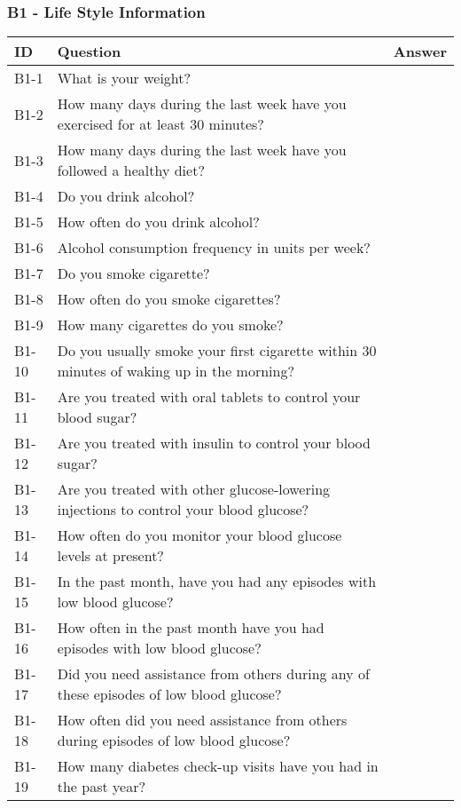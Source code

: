 \subsubsection{B1 - Life Style Information}
\begin{table}[H]
    \centering
    \renewcommand{\arraystretch}{1.2}
    \begin{tabularx}{\textwidth}{|l|X|l|}
        \hline
        \textbf{ID} & \textbf{Question} & \textbf{Answer} \\ \hline
        B1-1  & What is your weight? & \\ \hline
        B1-2  & How many days during the last week have you exercised for at least 30 minutes? & \\ \hline
        B1-3  & How many days during the last week have you followed a healthy diet? & \\ \hline
        B1-4  & Do you drink alcohol? & \\ \hline
        B1-5  & How often do you drink alcohol? & \\ \hline
        B1-6  & Alcohol consumption frequency in units per week? & \\ \hline
        B1-7  & Do you smoke cigarette? & \\ \hline
        B1-8  & How often do you smoke cigarettes? & \\ \hline
        B1-9  & How many cigarettes do you smoke? & \\ \hline
        B1-10 & Do you usually smoke your first cigarette within 30 minutes of waking up in the morning? & \\ \hline
        B1-11 & Are you treated with oral tablets to control your blood sugar? &  \\ \hline
        B1-12 & Are you treated with insulin to control your blood sugar? &  \\ \hline
        B1-13 & Are you treated with other glucose-lowering injections to control your blood glucose? &  \\ \hline
        B1-14 & How often do you monitor your blood glucose levels at present? & \\ \hline
        B1-15 & In the past month, have you had any episodes with low blood glucose? &  \\ \hline
        B1-16 & How often in the past month have you had episodes with low blood glucose? & \\ \hline
        B1-17 & Did you need assistance from others during any of these episodes of low blood glucose? &  \\ \hline
        B1-18 & How often did you need assistance from others during episodes of low blood glucose? & \\ \hline
        B1-19 & How many diabetes check-up visits have you had in the past year? & \\ \hline
    \end{tabularx}
\end{table}

